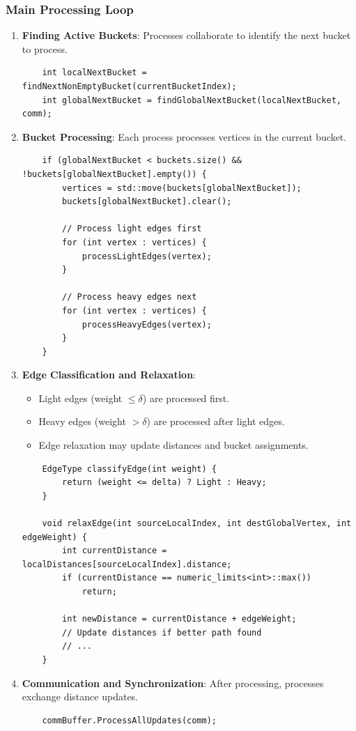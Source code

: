 \documentclass{article}
\begin{document}
\subsubsection*{Main Processing Loop}
\begin{enumerate}
    \item \textbf{Finding Active Buckets}: Processes collaborate to identify the next bucket to process.
    \begin{verbatim}
    int localNextBucket = findNextNonEmptyBucket(currentBucketIndex);
    int globalNextBucket = findGlobalNextBucket(localNextBucket, comm);
    \end{verbatim}
    
    \item \textbf{Bucket Processing}: Each process processes vertices in the current bucket.
    \begin{verbatim}
    if (globalNextBucket < buckets.size() && !buckets[globalNextBucket].empty()) {
        vertices = std::move(buckets[globalNextBucket]);
        buckets[globalNextBucket].clear();
        
        // Process light edges first
        for (int vertex : vertices) {
            processLightEdges(vertex);
        }
        
        // Process heavy edges next
        for (int vertex : vertices) {
            processHeavyEdges(vertex);
        }
    }
    \end{verbatim}
    
    \item \textbf{Edge Classification and Relaxation}: 
    \begin{itemize}
        \item Light edges (weight $\leq \delta$) are processed first.
        \item Heavy edges (weight $> \delta$) are processed after light edges.
        \item Edge relaxation may update distances and bucket assignments.
    \end{itemize}
    \begin{verbatim}
    EdgeType classifyEdge(int weight) {
        return (weight <= delta) ? Light : Heavy;
    }
    
    void relaxEdge(int sourceLocalIndex, int destGlobalVertex, int edgeWeight) {
        int currentDistance = localDistances[sourceLocalIndex].distance;
        if (currentDistance == numeric_limits<int>::max())
            return;
            
        int newDistance = currentDistance + edgeWeight;
        // Update distances if better path found
        // ...
    }
    \end{verbatim}
    
    \item \textbf{Communication and Synchronization}: After processing, processes exchange distance updates.
    \begin{verbatim}
    commBuffer.ProcessAllUpdates(comm);
    \end{verbatim}
\end{enumerate}
\end{document}
